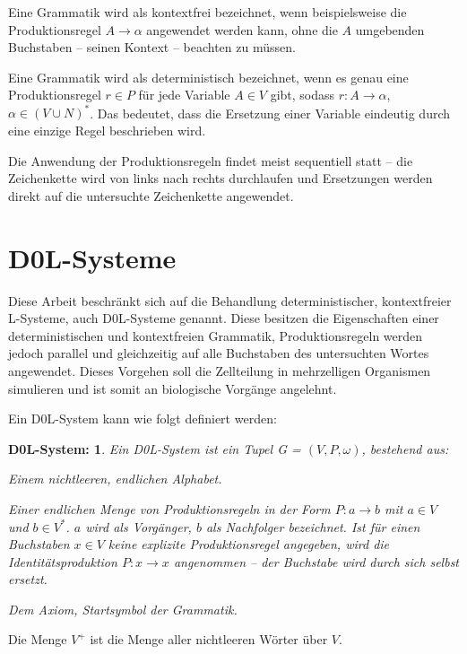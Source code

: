 Eine Grammatik wird als kontextfrei bezeichnet, wenn beispielsweise die Produktionsregel $A \rightarrow \alpha$ angewendet werden kann, ohne die $A$ umgebenden Buchstaben -- seinen Kontext -- beachten zu müssen. \cite[S.343]{ThI:14} 

Eine Grammatik wird als deterministisch bezeichnet, wenn es genau eine Produktionsregel $r \in P$ für jede Variable $A \in V$ gibt, sodass $r: A \rightarrow \alpha$, $\alpha \in (V \cup N )^*$. Das bedeutet, dass die Ersetzung einer Variable eindeutig durch eine einzige Regel beschrieben wird. \cite[S.75]{PCGiG:16}

Die Anwendung der Produktionsregeln findet meist sequentiell statt -- die Zeichenkette wird von links nach rechts durchlaufen und Ersetzungen werden direkt auf die untersuchte Zeichenkette angewendet. \cite[S.75]{PCGiG:16}

\section{D0L-Systeme}

Diese Arbeit beschränkt sich auf die Behandlung deterministischer, kontextfreier L-Systeme, auch D0L-Systeme genannt. Diese besitzen die Eigenschaften einer deterministischen und kontextfreien Grammatik, Produktionsregeln werden jedoch parallel und gleichzeitig auf alle Buchstaben des untersuchten Wortes angewendet. Dieses Vorgehen soll die Zellteilung in mehrzelligen Organismen simulieren und ist somit an biologische Vorgänge angelehnt. \cite[S. 3]{ABOP:04} 

Ein D0L-System kann wie folgt definiert werden:
\newtheorem{defD0LSystem}{D0L-System:}[chapter]
\begin{defD0LSystem}
	Ein D0L-System ist ein Tupel G = $(V, P, \omega)$, bestehend aus:
	
	\begin{description}[labelindent]
		\item[\boldmath$V$] Einem nichtleeren, endlichen Alphabet.\\
		
		\item[\boldmath$P$] Einer endlichen Menge von Produktionsregeln in der Form $P: a \rightarrow b$ mit $a \in V$ und $b \in V^*$. $a$ wird als Vorgänger, $b$ als Nachfolger bezeichnet. Ist für einen Buchstaben $x \in V$ keine explizite Produktionsregel angegeben, wird die Identitätsproduktion $P: x \rightarrow x$ angenommen -- der Buchstabe wird durch sich selbst ersetzt.\\
		
		\item[\boldmath$\omega \in V^+$]  Dem Axiom, Startsymbol der Grammatik.		
	\end{description}
\cite[S.4]{ABOP:04} 
\end{defD0LSystem}
Die Menge $V^+$ ist die Menge aller nichtleeren Wörter über $V$.  

